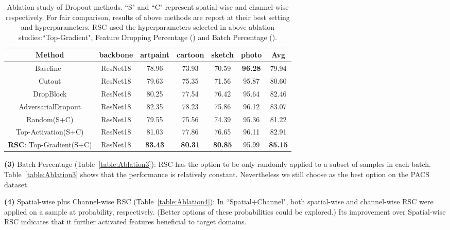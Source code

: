 \documentclass[runningheads]{llncs}
\begin{document}
\begin{table}[!htb]
\footnotesize
\centering \fontsize{7}{8}\selectfont
\begin{tabular}{c| c| c| c| c| c|| c } \hline Method & backbone & artpaint & cartoon & sketch & photo & Avg  \\ [0.5ex] \hline\hline Baseline~\cite{carlucci2019domain}& ResNet18  & 78.96 & 73.93  & 70.59 & \textbf{96.28} & 79.94 \\ Cutout\cite{devries2017improved}& ResNet18  & 79.63 & 75.35  & 71.56 & 95.87 & 80.60 \\ DropBlock\cite{ghiasi2018dropblock}& ResNet18  & 80.25 & 77.54  & 76.42 & 95.64 & 82.46 \\ AdversarialDropout\cite{park2018adversarial}& ResNet18  & 82.35 &  78.23 & 75.86 & 96.12 & 83.07 \\ Random(S+C)& ResNet18  & 79.55 & 75.56 & 74.39 & 95.36 &  81.22\\ Top-Activation(S+C)& ResNet18  & 81.03 & 77.86  & 76.65 & 96.11 & 82.91 \\ \textbf{RSC}: Top-Gradient(S+C)& ResNet18  & \textbf{83.43} & \textbf{80.31}  & \textbf{80.85} &95.99  & \textbf{85.15} \\ \hline 
\end{tabular}
\vspace{0.5em}
\caption{Ablation study of Dropout methods. ``S" and ``C" represent spatial-wise and channel-wise respectively. For fair comparison, results of above methods are report at their best setting and hyperparameters. RSC used the hyperparameters selected in above ablation studies:``Top-Gradient", Feature Dropping Percentage () and Batch Percentage (). } \vspace{-1em}
\label{table:Ablation5} \end{table}


\textbf{(3)} Batch Percentage (Table~\ref{table:Ablation3}): RSC has the option to be only randomly applied to a subset of samples in each batch.
Table~\ref{table:Ablation3} shows that the performance is relatively constant. Nevertheless we still choose  as the best option on the PACS dataset. 

\textbf{(4)} Spatial-wise plus Channel-wise RSC (Table~\ref{table:Ablation4}): 
In ``Spatial+Channel", both spatial-wise and channel-wise RSC were applied on a sample at  probability, respectively. (Better options of these probabilities could be explored.) Its improvement over Spatial-wise RSC indicates that it further activated features beneficial to target domains.
\end{document}
